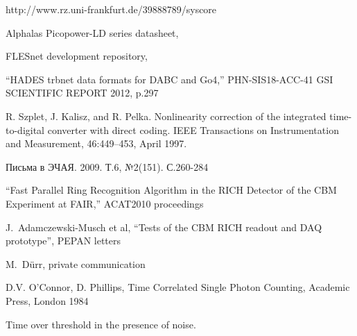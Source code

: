\begin{thebibliography}{99}
http://www.rz.uni-frankfurt.de/39888789/syscore

Alphalas Picopower-LD series datasheet,



FLESnet development repository,

``HADES trbnet data formats for DABC and Go4,''
PHN-SIS18-ACC-41
GSI SCIENTIFIC REPORT 2012, p.297

R. Szplet, J. Kalisz, and R. Pelka. Nonlinearity correction of the integrated time-to-digital converter with direct coding. IEEE Transactions on Instrumentation and Measurement, 46:449–453, April 1997.

Письма в ЭЧАЯ. 2009. Т.6, №2(151). С.260-284

``Fast Parallel Ring Recognition Algorithm in the RICH Detector of the CBM Experiment at FAIR,''
ACAT2010 proceedings


J.~Adamczewski-Musch et al,
``Tests of the CBM RICH readout and DAQ prototype'',
PEPAN letters

M.~D\"urr, private communication

D.V. O’Connor, D. Phillips, Time Correlated Single Photon Counting, Academic Press, London 1984

Time over threshold in the presence of noise.


\end{thebibliography}
